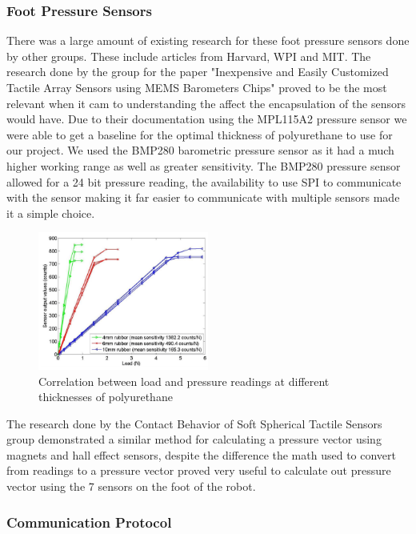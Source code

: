     \subsubsection{Foot Pressure Sensors}
    There was a large amount of existing research for these foot pressure sensors done by other groups. These include articles from Harvard\cite{chuah2012composite}\cite{chuah2014enabling}, WPI\cite{youssefian2014contact} and MIT\cite{tenzer2014inexpensive}. The research done by the group for the paper "Inexpensive and Easily Customized Tactile Array Sensors using MEMS Barometers Chips" \cite{chuah2012composite} proved to be the most relevant when it cam to understanding the affect the encapsulation of the sensors would have. Due to their documentation using the MPL115A2 pressure sensor we were able to get a baseline for the optimal thickness of polyurethane to use for our project. We used the BMP280 barometric pressure sensor \cite{BMP280} as it had a much higher working range as well as greater sensitivity. The BMP280 pressure sensor allowed for a 24 bit pressure reading, the availability to use SPI to communicate with the sensor making it far easier to communicate with multiple sensors made it a simple choice.
    \begin{figure}[H]
        \centering
        \includegraphics[width=0.5\textwidth]{figures/Load_vs_SensorvsThickness.png}
        \caption{Correlation between load and pressure readings at different thicknesses of polyurethane\cite{chuah2012composite}}
        \label{fig:my_label}
    \end{figure}

    The research done by the Contact Behavior of Soft Spherical Tactile Sensors\cite{youssefian2014contact} group demonstrated a similar method for calculating a pressure vector using magnets and hall effect sensors, despite the difference the math used to convert from readings to a pressure vector proved very useful to calculate out pressure vector using the 7 sensors on the foot of the robot. 
    \subsubsection{Communication Protocol}
